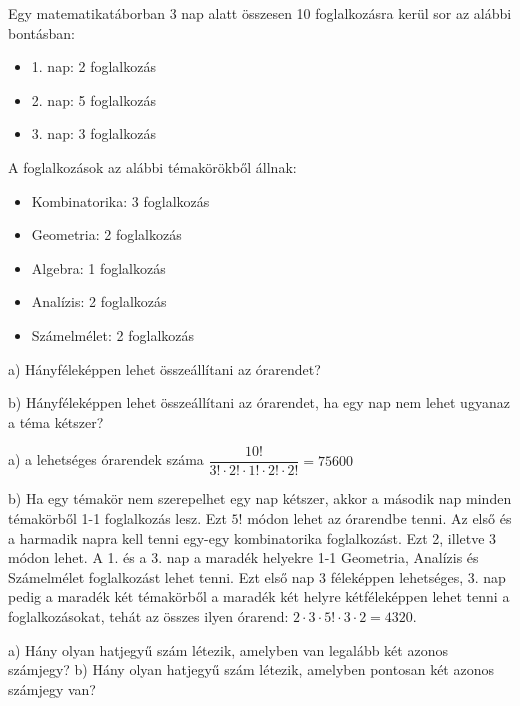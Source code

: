 \begin{extraproblem}
Egy matematikatáborban 3 nap alatt összesen 10 foglalkozásra kerül
sor az alábbi bontásban:
\begin{itemize}
\item 1. nap: 2 foglalkozás
\item 2. nap: 5 foglalkozás
\item 3. nap: 3 foglalkozás
\end{itemize}
A foglalkozások az alábbi témakörökből állnak:
\begin{itemize}
\item  Kombinatorika: 3 foglalkozás
 \item Geometria: 2 foglalkozás
 \item Algebra: 1 foglalkozás
 \item Analízis: 2 foglalkozás
 \item Számelmélet: 2 foglalkozás
\end{itemize}

a) Hányféleképpen lehet összeállítani az órarendet?

b) Hányféleképpen lehet összeállítani az órarendet, ha egy nap nem
lehet ugyanaz a téma kétszer? 
\end{extraproblem}

\begin{solution}
a) a lehetséges órarendek száma $\dfrac{10!}{3!\cdot2!\cdot1!\cdot2!\cdot2!}=75600$

b) Ha egy témakör nem szerepelhet egy nap kétszer, akkor a második
nap minden témakörből 1-1 foglalkozás lesz. Ezt $5!$ módon lehet az
órarendbe tenni. Az első és a harmadik napra kell tenni egy-egy kombinatorika
foglalkozást. Ezt 2, illetve 3 módon lehet. A 1. és a 3. nap a maradék
helyekre 1-1 Geometria, Analízis és Számelmélet foglalkozást lehet
tenni. Ezt első nap 3 féleképpen lehetséges, 3. nap pedig a maradék
két témakörből a maradék két helyre kétféleképpen lehet tenni a foglalkozásokat,
tehát az összes ilyen órarend: $2\cdot3\cdot5!\cdot3\cdot2=4320$.
\end{solution}
\begin{extraproblem}
 a) Hány olyan hatjegyű szám létezik, amelyben van legalább két azonos
számjegy? b) Hány olyan hatjegyű szám létezik, amelyben pontosan két
azonos számjegy van? 
\end{extraproblem}


